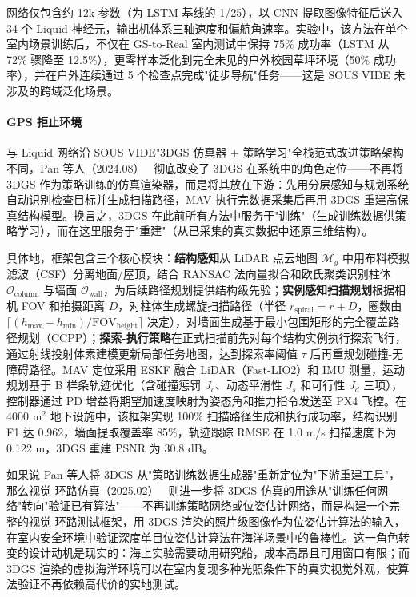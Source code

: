 网络仅包含约 12k 参数（为 LSTM 基线的 1/25），以 CNN 提取图像特征后送入 34 个 Liquid 神经元，输出机体系三轴速度和偏航角速率。实验中，该方法在单个室内场景训练后，不仅在 GS-to-Real 室内测试中保持 75\% 成功率（LSTM 从 72\% 骤降至 12.5\%），更零样本泛化到完全未见的户外校园草坪环境（50\% 成功率），并在户外连续通过 5 个检查点完成"徒步导航"任务——这是 SOUS VIDE 未涉及的跨域泛化场景。

\paragraph{GPS 拒止环境}

与 Liquid 网络沿 SOUS VIDE"3DGS 仿真器 + 策略学习"全栈范式改进策略架构不同，Pan 等人（2024.08）~\cite{2408_06030} 彻底改变了 3DGS 在系统中的角色定位——不再将 3DGS 作为策略训练的仿真渲染器，而是将其放在下游：先用分层感知与规划系统自动识别检查目标并生成扫描路径，MAV 执行完数据采集后再用 3DGS 重建高保真结构模型。换言之，3DGS 在此前所有方法中服务于"训练"（生成训练数据供策略学习），而在这里服务于"重建"（从已采集的真实数据中还原三维结构）。

具体地，框架包含三个核心模块：\textbf{结构感知}从 LiDAR 点云地图 $\mathcal{M}_g$ 中用布料模拟滤波（CSF）分离地面/屋顶，结合 RANSAC 法向量拟合和欧氏聚类识别柱体 $\mathcal{O}_{\mathrm{column}}$ 与墙面 $\mathcal{O}_{\mathrm{wall}}$，为后续路径规划提供结构级先验；\textbf{实例感知扫描规划}根据相机 FOV 和拍摄距离 $D$，对柱体生成螺旋扫描路径（半径 $r_{\mathrm{spiral}}=r+D$，圈数由 $\lceil(h_{\max}-h_{\min})/\mathrm{FOV}_{\mathrm{height}}\rceil$ 决定），对墙面生成基于最小包围矩形的完全覆盖路径规划（CCPP）；\textbf{探索-执行策略}在正式扫描前先对每个结构实例执行探索飞行，通过射线投射体素建模更新局部任务地图，达到探索率阈值 $\tau$ 后再重规划碰撞-无障碍路径。MAV 定位采用 ESKF 融合 LiDAR（Fast-LIO2）和 IMU 测量，运动规划基于 B 样条轨迹优化（含碰撞惩罚 $J_c$、动态平滑性 $J_s$ 和可行性 $J_d$ 三项），控制器通过 PD 增益将期望加速度映射为姿态角和推力指令发送至 PX4 飞控。在 4000 m$^2$ 地下设施中，该框架实现 100\% 扫描路径生成和执行成功率，结构识别 F1 达 0.962，墙面提取覆盖率 85\%，轨迹跟踪 RMSE 在 1.0 m/s 扫描速度下为 0.122 m，3DGS 重建 PSNR 为 30.8 dB。

如果说 Pan 等人将 3DGS 从"策略训练数据生成器"重新定位为"下游重建工具"，那么视觉-环路仿真（2025.02）~\cite{2502_05409} 则进一步将 3DGS 仿真的用途从"训练任何网络"转向"验证已有算法"——不再训练策略网络或位姿估计网络，而是构建一个完整的视觉-环路测试框架，用 3DGS 渲染的照片级图像作为位姿估计算法的输入，在室内安全环境中验证深度单目位姿估计算法在海洋场景中的鲁棒性。这一角色转变的设计动机是现实的：海上实验需要动用研究船，成本高昂且可用窗口有限；而 3DGS 渲染的虚拟海洋环境可以在室内复现多种光照条件下的真实视觉外观，使算法验证不再依赖高代价的实地测试。

